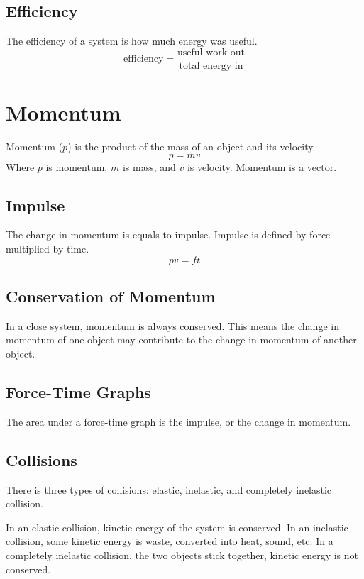 \documentclass[../notes.tex]{subfiles}
\begin{document}
\subsection{Efficiency}
The efficiency of a system is how much energy was useful.
\begin{equation}
	\textrm{efficiency} = \frac{ \textrm{useful work out} }{ \textrm{total energy in} }
\end{equation}

\section{Momentum}
Momentum ($p$) is the product of the mass of an object and its velocity.
\begin{equation}
	p = mv
\end{equation}
Where $p$ is momentum, $m$ is mass, and $v$ is velocity.
Momentum is a vector.

\subsection{Impulse}
The change in momentum is equals to impulse.
Impulse is defined by force multiplied by time.
\begin{equation}
	pv = ft
\end{equation}

\subsection{Conservation of Momentum}
In a close system, momentum is always conserved.
This means the change in momentum of one object may contribute to the change in momentum of another object.

\subsection{Force-Time Graphs}
The area under a force-time graph is the impulse, or the change in momentum.

\subsection{Collisions}
There is three types of collisions: elastic, inelastic, and completely inelastic collision.

In an elastic collision, kinetic energy of the system is conserved.
In an inelastic collision, some kinetic energy is waste, converted into heat, sound, etc.
In a completely inelastic collision, the two objects stick together, kinetic energy is not conserved.
\end{document}
